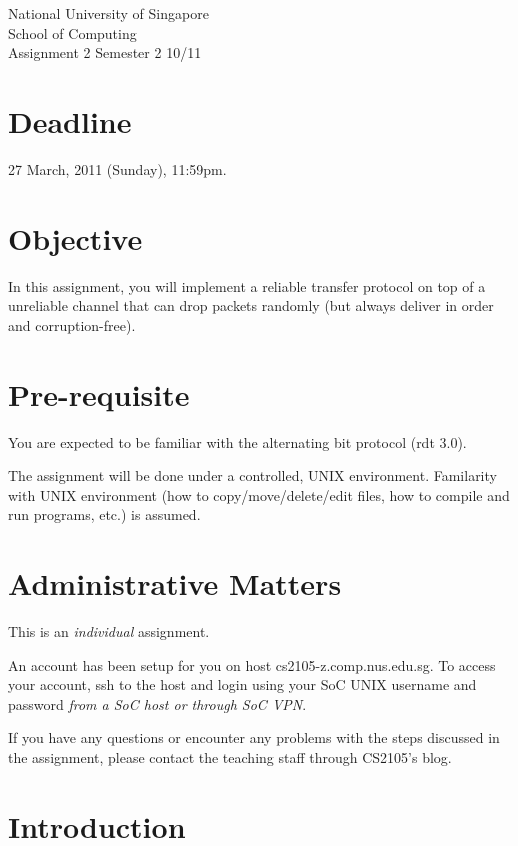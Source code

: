 \documentclass[a4paper,11pt]{exam}
\begin{document}
    \extraheadheight{.5in}
    {\large\sf National University of Singapore\\ School of Computing \\
    \LARGE\sf Assignment 2}%
    {\large\sf Semester 2 10/11}
    \firstpageheadrule
    \pagestyle{headandfoot}

    \section*{Deadline}

    27 March, 2011 (Sunday), 11:59pm.

    \section*{Objective}

    In this assignment, you will implement a reliable transfer protocol on top of a unreliable channel that can drop packets randomly (but always deliver in order and corruption-free).

    \section*{Pre-requisite}

You are expected to be familiar with the alternating bit protocol (rdt 3.0).

The assignment will be done under a controlled, UNIX environment. Familarity with UNIX environment (how to copy/move/delete/edit files, how to compile and run programs, etc.) is assumed.

\section*{Administrative Matters}

This is an \textit{individual} assignment.

An account has been setup for you on host cs2105-z.comp.nus.edu.sg. To access your account, ssh to the host and login using your SoC UNIX username and password \textit{from a SoC host or through SoC VPN}.

If you have any questions or encounter any problems with the steps discussed in the assignment, please contact the teaching staff through CS2105's blog.

\section*{Introduction}
\end{document}
